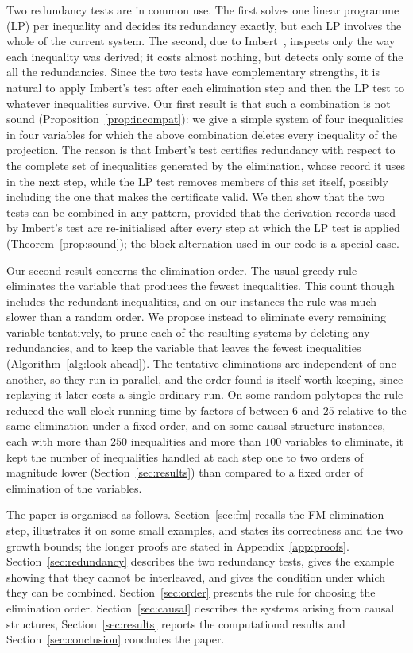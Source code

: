 \documentclass[11pt]{article}
\theoremstyle{definition}
\begin{document}
Two redundancy tests are in common use. The first solves one linear programme (LP) per inequality and decides its redundancy exactly, but each LP involves the whole of the current system. The second, due to Imbert~\cite{imbert1990,imbert1993}, inspects only the way each inequality was derived; it costs almost nothing, but detects only some of the all the redundancies. Since the two tests have complementary strengths, it is natural to apply Imbert's test after each elimination step and then the LP test to whatever inequalities survive. Our first result is that such a combination is not sound (Proposition~\ref{prop:incompat}): we give a simple system of four inequalities in four variables for which the above combination deletes every inequality of the projection. The reason is that Imbert's test certifies redundancy with respect to the complete set of inequalities generated by the elimination, whose record it uses in the next step, while the LP test removes members of this set itself, possibly including the one that makes the certificate valid. We then show that the two tests can be combined in any pattern, provided that the derivation records used by Imbert's test are re-initialised after every step at which the LP test is applied (Theorem~\ref{prop:sound}); the block alternation used in our code is a special case.

Our second result concerns the elimination order. The usual greedy rule eliminates the variable that produces the fewest inequalities. This count though includes the redundant inequalities, and on our instances the rule was much slower than a random order. We propose instead to eliminate every remaining variable tentatively, to prune each of the resulting systems by deleting any redundancies, and to keep the variable that leaves the fewest inequalities (Algorithm~\ref{alg:look-ahead}). The tentative eliminations are independent of one another, so they run in parallel, and the order found is itself worth keeping, since replaying it later costs a single ordinary run. On some random polytopes the rule reduced the wall-clock running time by factors of between $6$ and $25$ relative to the same elimination under a fixed order, and on some causal-structure instances, each with more than $250$ inequalities and more than $100$ variables to eliminate, it kept the number of inequalities handled at each step one to two orders of magnitude lower (Section~\ref{sec:results}) than compared to a fixed order of elimination of the variables.

The paper is organised as follows. Section~\ref{sec:fm} recalls the FM elimination step, illustrates it on some small examples, and states its correctness and the two growth bounds; the longer proofs are stated in Appendix~\ref{app:proofs}. Section~\ref{sec:redundancy} describes the two redundancy tests, gives the example showing that they cannot be interleaved, and gives the condition under which they can be combined. Section~\ref{sec:order} presents the rule for choosing the elimination order. Section~\ref{sec:causal} describes the systems arising from causal structures, Section~\ref{sec:results} reports the computational results and Section~\ref{sec:conclusion} concludes the paper.
\end{document}
